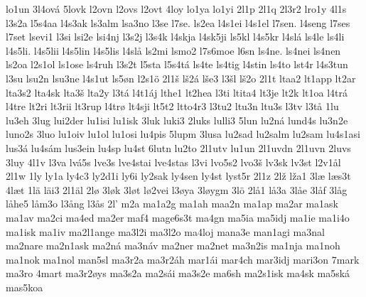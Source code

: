 {    lo1un
    3l4ová
    5lovk
    l2ovn
    l2ovs
    l2ovt
    4loy
    lo1ya
    lo1yi
    2l1p
    2l1q
    2l3r2
    lro1y
    4l1s
    l3s2a
    l5s4aa
    l4s3ak
    ls3alm
    lsa3no
    l3se
    l7se.
    ls2ea
    l4s1ei
    l4s1el
    l7sen.
    l4seng
    l7ses
    l7set
    lsevi1
    l3si
    lsi2e
    lsi4nj
    l3s2j
    l3s4k
    l4skja
    l4sk5ji
    ls5kl
    l4s5kr
    l4slá
    ls4le
    ls4li
    l4s5li.
    l4s5lii
    l4s5lin
    l4s5lis
    l4slå
    ls2mi
    lsmo2
    l7s6moe
    l6sn
    ls4ne.
    ls4nei
    ls4nen
    ls2oa
    l2s1ol
    ls1ose
    ls4ruh
    l3s2t
    l5sta
    l5s4tá
    ls4te
    ls4tig
    l4stin
    ls4to
    lst4r
    l4s3tun
    l3su
    lsu2n
    lsu3ne
    l4s1ut
    ls5øn
    l2s1ö
    2l1š
    lš2á
    lše3
    l3šl
    lš2o
    2l1t
    ltaa2
    lt1app
    lt2ar
    lta3s2
    lta4sk
    lta3š
    lta2y
    l3tá
    l4t1áj
    lthe1
    lt2hea
    l3ti
    ltita4
    lt3je
    lt2k
    lt1oa
    l4trá
    l4tre
    lt2ri
    lt3rii
    lt3rup
    l4trø
    lt4sji
    lt5t2
    ltto4r3
    l3tu2
    ltu3n
    ltu3s
    l3tv
    l3tå
    1lu
    lu3eh
    3lug
    lui2der
    lu1isi
    lu1isk
    3luk
    luki3
    2luks
    lulli3
    5lun
    lu2ná
    lund4s
    lu3n2e
    luno2s
    3luo
    lu1oiv
    lu1ol
    lu1osi
    lu4pis
    5lupm
    3lusa
    lu2sad
    lu2salm
    lu2sam
    lu4s1asi
    lus3á
    lu4sám
    lus3ein
    lu4sp
    lu4st
    6lutn
    lu2to
    2l1utv
    lu1un
    2l1uvdn
    2l1uvn
    2luvs
    3luy
    4l1v
    l3va
    lvá5s
    lve3s
    lve4stai
    lve4stas
    l3vi
    lvo5s2
    lvo3š
    lv3sk
    lv3st
    l2v1ål
    2l1w
    1ly
    ly1a
    ly4c3
    ly2d1i
    ly6i
    ly2sak
    ly4sen
    ly4st
    lyst5r
    2l1z
    2lž
    lža1
    3læ
    læs3t
    4læt
    1lä
    läi3
    2l1äl
    2lø
    3løk
    3løt
    lø2vei
    l3øya
    3løygm
    3lö
    2lå1
    lå3a
    3låe
    3låf
    3låg
    låhe5
    låm3o
    l3ång
    l3ås
    2l'
    m2a
    ma1a2g
    ma1ah
    maa2n
    ma1ap
    ma2ar
    ma1ask
    ma1av
    ma2ci
    ma4ed
    ma2er
    maf4
    mage6s3t
    ma4gn
    ma5ia
    ma5idj
    ma1ie
    ma1i4o
    ma1isk
    ma1iv
    ma2l1ange
    ma3l2i
    ma3l2o
    ma4loj
    mana3e
    man1agi
    ma3nal
    ma2nare
    ma2n1ask
    ma2ná
    ma3náv
    ma2ner
    ma2net
    ma3n2is
    ma1nja
    ma1noh
    ma1nok
    ma1nol
    man5sl
    ma3r2a
    ma3r2áh
    mar1ái
    mar4ch
    mar3idj
    mari3on
    7mark
    ma3ro
    4mart
    ma3r2øys
    ma3s2a
    ma2sái
    ma3s2e
    ma6sh
    ma2s1isk
    ma4sk
    ma5ská
    mas5koa
}
